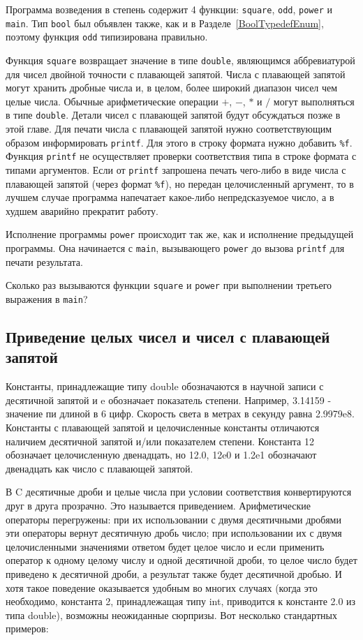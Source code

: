 Программа возведения в степень содержит 4 функции: \lstinline|square|, \lstinline|odd|, \lstinline|power| и \lstinline|main|. Тип \lstinline|bool| был объявлен также, как и в Разделе~\ref{BoolTypedefEnum}, поэтому функция \lstinline|odd| типизирована правильно.

Функция \lstinline|square| возвращает значение в типе \lstinline|double|, являющимся аббревиатурой для чисел двойной точности с плавающей запятой. Числа с плавающей запятой могут хранить дробные числа и, в целом, более широкий диапазон чисел чем целые числа. Обычные арифметические операции $+$, $-$, $*$ и $/$ могут выполняться в типе \lstinline|double|. Детали чисел с плавающей запятой будут обсуждаться позже в этой главе. Для печати числа с плавающей запятой нужно соответствующим образом информировать \lstinline|printf|. Для этого в строку формата нужно добавить \lstinline|%f|. Функция \lstinline|printf| не осуществляет проверки соответствия типа в строке формата с типами аргументов. Если от \lstinline|printf| запрошена печать чего-либо в виде числа с плавающей запятой (через формат \lstinline|%f|), но передан целочисленный аргумент, то в лучшем случае программа напечатает какое-либо непредсказуемое число, а в худшем аварийно прекратит работу.

Исполнение программы \lstinline|power| происходит так же, как и исполнение предыдущей программы. Она начинается с \lstinline|main|, вызывающего \lstinline|power| до вызова \lstinline|printf| для печати результата.

\exercise Сколько раз вызываются функции \lstinline|square| и \lstinline|power| при выполнении третьего выражения в \lstinline|main|?\label{ex_2.8}

\subsection{Приведение целых чисел и чисел с плавающей запятой}\label{coercionsIntegerFloating}

Константы, принадлежащие типу double обозначаются в научной записи с десятичной запятой и e обозначает показатель степени. Например, 3.14159 - значение пи длиной в 6 цифр. Скорость света в метрах в секунду равна 2.9979e8. Константы с плавающей запятой и целочисленные константы отличаются наличием десятичной запятой и/или показателем степени. Константа 12 обозначает целочисленную двенадцать, но 12.0, 12e0 и 1.2e1 обозначают двенадцать как число с плавающей запятой.

В C десятичные дроби и целые числа при условии соответствия конвертируются друг в друга прозрачно. Это называется приведением. Арифметические операторы перегружены: при их использовании с двумя десятичными дробями эти операторы вернут десятичную дробь число; при использовании их с двумя целочисленными значениями ответом будет целое число и если применить оператор к одному целому числу и одной десятичной дроби, то целое число будет приведено к десятичной дроби, а результат также будет десятичной дробью. И хотя такое поведение оказывается удобным во многих случаях (когда это необходимо, константа 2, принадлежащая типу int, приводится к константе 2.0 из типа double), возможны неожиданные сюрпризы. Вот несколько стандартных примеров:

